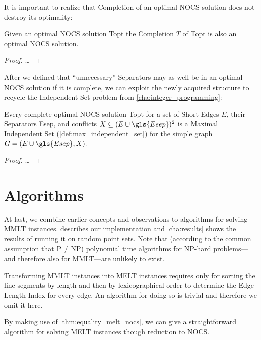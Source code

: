 It is important to realize that Completion of an optimal \gls{NOCS}
solution does not destroy its optimality:

\begin{theorem}
  Given an optimal \gls{NOCS} solution \gls{Topt}
  the Completion \(T\) of \gls{Topt}
  is also an optimal \gls{NOCS} solution.
  \begin{proof}
    \ldots{}
  \end{proof}
\end{theorem}

After we defined that ``unnecessary'' Separators may as well be in
an optimal \gls{NOCS} solution if it is complete, we can exploit the
newly acquired structure to recycle the Independent Set problem from
\cref{cha:integer_programming}:

\begin{theorem}
  Every complete optimal \gls{NOCS} solution \gls{Topt}
  for a set of Short Edges \(E\), their Separators \gls{Esep},
  and conflicts \(X \subseteq (E \cup \gls{Esep})^2\)
  is a Maximal Independent Set (\cref{def:max_independent_set})
  for the simple graph \(G = (E \cup \gls{Esep}, X)\).
  \begin{proof}
    \ldots{}
  \end{proof}
\end{theorem}

\section{Algorithms}
At last, we combine earlier concepts and observations to algorithms
for solving \gls{MMLT} instances.  describes
our implementation and \cref{cha:results} shows the results of running
it on random point sets. Note that (according to the common assumption
that P\(\not=\)NP) polynomial time algorithms for NP-hard
problems---and therefore also for \gls{MMLT}---are unlikely to exist.

Transforming \gls{MMLT} instances into \gls{MELT} instances requires
only for sorting the line segments by length and then by
lexicographical order to determine the Edge Length Index for every
edge. An algorithm for doing so is trivial and therefore we omit it
here.

By making use of \cref{thm:equality_melt_nocs}, we can give a
straightforward algorithm for solving \gls{MELT} instances though
reduction to \gls{NOCS}.

